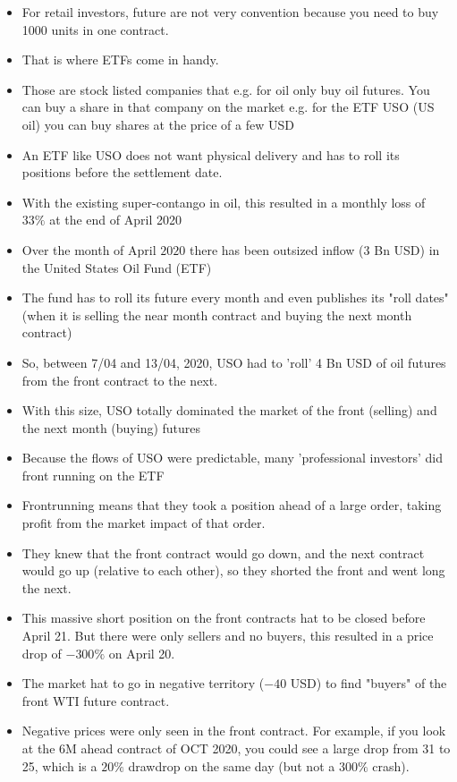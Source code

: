 \begin{itemize}
    \item For retail investors, future are not very convention because
        you need to buy 1000 units in one contract.
    \item That is where ETFs come in handy.
    \item Those are stock listed companies that e.g. for oil only buy oil
        futures. You can buy a share in that company on the market e.g. for
        the ETF USO (US oil) you can buy shares at the price of a few USD
    \item An ETF like USO does not want physical delivery and has to roll
        its positions before the settlement date.
    \item With the existing super-contango in oil, this resulted in a monthly
        loss of $33\%$ at the end of April 2020
    \item Over the month of April $2020$ there has been outsized inflow
        (3 Bn USD) in the United States Oil Fund (ETF)
    \item The fund has to roll its future every month and even publishes its
        "roll dates" (when it is selling the near month contract and buying
        the next month contract)
    \item So, between 7/04 and 13/04, 2020, USO had to 'roll' 4 Bn USD of
        oil futures from the front contract to the next.
    \item With this size, USO totally dominated the market of the front
        (selling) and the next month (buying) futures
    \item Because the flows of USO were predictable, many 'professional
        investors' did front running on the ETF
    \item Frontrunning means that they took a position ahead of a large order,
        taking profit from the market impact of that order.
    \item They knew that the front contract would go down, and the next
        contract would go up (relative to each other), so they shorted
        the front and went long the next.
    \item This massive short position on the front contracts hat to be
        closed before April 21. But there were only sellers and no buyers,
        this resulted in a price drop of $-300\%$ on April 20.
    \item The market hat to go in negative territory ($-40$ USD) to find
        "buyers" of the front WTI future contract.
    \item Negative prices were only seen in the front contract. For example,
        if you look at the 6M ahead contract of OCT 2020, you could see a
        large drop from 31 to 25, which is a $20\%$ drawdrop on the same
        day (but not a $300\%$ crash).
\end{itemize}

